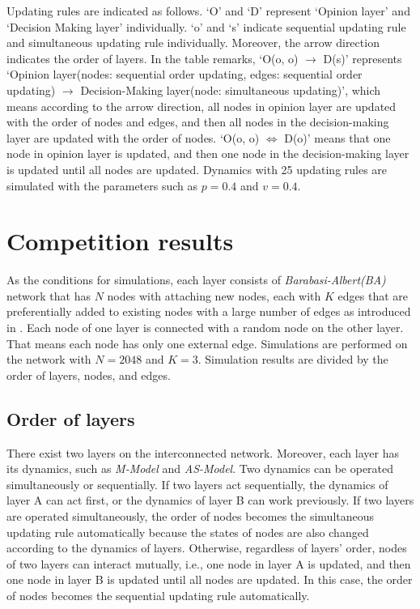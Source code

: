 Updating rules are indicated as follows. `O' and `D'  represent `Opinion layer' and `Decision Making layer' individually. `o' and `s' indicate sequential updating rule and simultaneous updating rule individually. Moreover, the arrow direction indicates the order of layers. In the table remarks, `O(o, o) $\to$ D(s)' represents `Opinion layer(nodes: sequential order updating, edges: sequential order updating) $\to$ Decision-Making layer(node: simultaneous updating)', which means according to the arrow direction, all nodes in opinion layer are updated with the order of nodes and edges, and then all nodes in the decision-making layer are updated with the order of nodes. `O(o, o) $\Leftrightarrow$ D(o)' means that one node in opinion layer is updated, and then one node in the decision-making layer is updated until all nodes are updated. Dynamics with 25 updating rules are simulated with the parameters such as $p=0.4$ and $v=0.4$. \\

\section{Competition results}
As the conditions for simulations, each layer consists of \textit{Barabasi-Albert(BA)} network that has $N$ nodes with attaching new nodes, each with $K$ edges that are preferentially added to existing nodes with a large number of edges as introduced in \parencite{barabasi1999}. Each node of one layer is connected with a random node on the other layer. That means each node has only one external edge. Simulations are performed on the network with $N=2048$ and $K=3$. Simulation results are divided by the order of layers, nodes, and edges.\\

\subsection{Order of layers}
\label{order of layer}
There exist two layers on the interconnected network. Moreover, each layer has its dynamics, such as \textit{M-Model} and \textit{AS-Model}. Two dynamics can be operated simultaneously or sequentially. If two layers act sequentially, the dynamics of layer A can act first, or the dynamics of layer B can work previously. If two layers are operated simultaneously, the order of nodes becomes the simultaneous updating rule automatically because the states of nodes are also changed according to the dynamics of layers. Otherwise, regardless of layers' order, nodes of two layers can interact mutually, i.e., one node in layer A is updated, and then one node in layer B is updated until all nodes are updated. In this case, the order of nodes becomes the sequential updating rule automatically.


